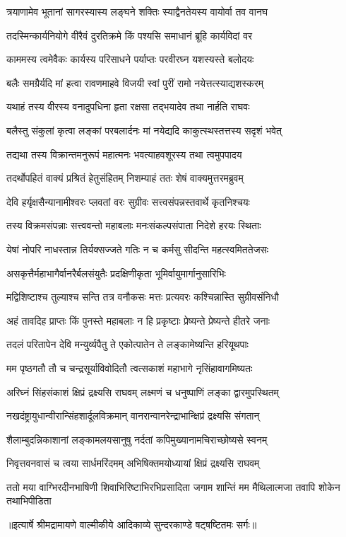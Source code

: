 \twolineshloka
{त्रयाणामेव भूतानां सागरस्यास्य लङ्घने}
{शक्तिः स्याद्वैनतेयस्य वायोर्वा तव वानघ} %

\twolineshloka
{तदस्मिन्कार्यनियोगे वीरैवं दुरतिक्रमे}
{किं पश्यसि समाधानं ब्रूहि कार्यविदां वर} %

\twolineshloka
{काममस्य त्वमेवैकः कार्यस्य परिसाधने}
{पर्याप्तः परवीरघ्न यशस्यस्ते बलोदयः} %

\twolineshloka
{बलैः समग्रैर्यदि मां हत्वा रावणमाहवे}
{विजयी स्वां पुरीं रामो नयेत्तत्स्याद्यशस्करम्} %

\twolineshloka
{यथाहं तस्य वीरस्य वनादुपधिना हृता}
{रक्षसा तद्भयादेव तथा नार्हति राघवः} %

\twolineshloka
{बलैस्तु संकुलां कृत्वा लङ्कां परबलार्दनः}
{मां नयेद्यदि काकुत्स्थस्तत्तस्य सदृशं भवेत्} %

\twolineshloka
{तद्यथा तस्य विक्रान्तमनुरूपं महात्मनः}
{भवत्याहवशूरस्य तथा त्वमुपपादय} %

\twolineshloka
{तदर्थोपहितं वाक्यं प्रश्रितं हेतुसंहितम्}
{निशम्याहं ततः शेषं वाक्यमुत्तरमब्रुवम्} %

\twolineshloka
{देवि हर्यृक्षसैन्यानामीश्वरः प्लवतां वरः}
{सुग्रीवः सत्त्वसंपन्नस्तवार्थे कृतनिश्चयः} %

\twolineshloka
{तस्य विक्रमसंपन्नाः सत्त्ववन्तो महाबलाः}
{मनःसंकल्पसंपाता निदेशे हरयः स्थिताः} %

\twolineshloka
{येषां नोपरि नाधस्तान्न तिर्यक्सज्जते गतिः}
{न च कर्मसु सीदन्ति महत्स्वमिततेजसः} %

\twolineshloka
{असकृत्तैर्महाभागैर्वानरैर्बलसंयुतैः}
{प्रदक्षिणीकृता भूमिर्वायुमार्गानुसारिभिः} %

\twolineshloka
{मद्विशिष्टाश्च तुल्याश्च सन्ति तत्र वनौकसः}
{मत्तः प्रत्यवरः कश्चिन्नास्ति सुग्रीवसंनिधौ} %

\twolineshloka
{अहं तावदिह प्राप्तः किं पुनस्ते महाबलाः}
{न हि प्रकृष्टाः प्रेष्यन्ते प्रेष्यन्ते हीतरे जनाः} %

\twolineshloka
{तदलं परितापेन देवि मन्युर्व्यपैतु ते}
{एकोत्पातेन ते लङ्कामेष्यन्ति हरियूथपाः} %

\twolineshloka
{मम पृष्ठगतौ तौ च चन्द्रसूर्याविवोदितौ}
{त्वत्सकाशं महाभागे नृसिंहावागमिष्यतः} %

\twolineshloka
{अरिघ्नं सिंहसंकाशं क्षिप्रं द्रक्ष्यसि राघवम्}
{लक्ष्मणं च धनुष्पाणिं लङ्का द्वारमुपस्थितम्} %

\twolineshloka
{नखदंष्ट्रायुधान्वीरान्सिंहशार्दूलविक्रमान्}
{वानरान्वानरेन्द्राभान्क्षिप्रं द्रक्ष्यसि संगतान्} %

\twolineshloka
{शैलाम्बुदन्निकाशानां लङ्कामलयसानुषु}
{नर्दतां कपिमुख्यानामचिराच्छोष्यसे स्वनम्} %

\twolineshloka
{निवृत्तवनवासं च त्वया सार्धमरिंदमम्}
{अभिषिक्तमयोध्यायां क्षिप्रं द्रक्ष्यसि राघवम्} %

\fourlineindentedshloka
{ततो मया वाग्भिरदीनभाषिणी}
{ शिवाभिरिष्टाभिरभिप्रसादिता}
{जगाम शान्तिं मम मैथिलात्मजा}
{ तवापि शोकेन तथाभिपीडिता} %


{॥इत्यार्षे श्रीमद्रामायणे वाल्मीकीये आदिकाव्ये सुन्दरकाण्डे षट्षष्टितमः सर्गः॥}

